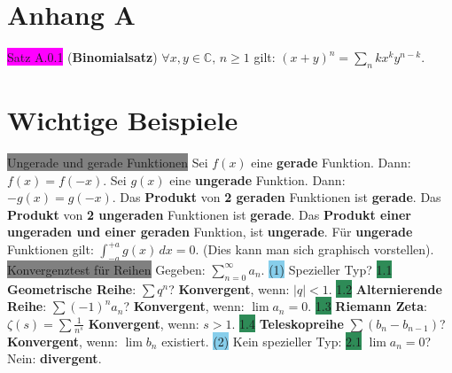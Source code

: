 \documentclass[landscape, 10pt]{article}
\newcommand{\C}{\mathbb{C}}
\begin{document}
\begin{multicols}{3}
\section{Anhang A}
\colorbox{magenta}{Satz A.0.1} (\textbf{Binomialsatz}) 
                \textcolor{NavyBlue}{$\forall x,y\in\C,\,n\geqslant1$} gilt: 
                \textcolor{NavyBlue}{$(x+y)^n=\sum_{n}{k}x^ky^{n-k}$}.


\section{Wichtige Beispiele}
\colorbox{gray}{Ungerade und gerade Funktionen} Sei \textcolor{NavyBlue}{$f(x)$}
                eine \textbf{gerade} Funktion. Dann: \textcolor{NavyBlue}{$f(x)=f(-x)$}.
                Sei \textcolor{NavyBlue}{$g(x)$} eine \textbf{ungerade} 
         Funktion. Dann: \textcolor{NavyBlue}{$-g(x)=g(-x)$}.
                Das \textbf{Produkt} von \textbf{2 geraden} Funktionen 
                ist \textbf{gerade}. Das \textbf{Produkt} von \textbf{2 
         ungeraden}
                Funktionen ist \textbf{gerade}. Das \textbf{Produkt einer 
                ungeraden und einer geraden} Funktion,
                ist \textbf{ungerade}.
         Für \textbf{ungerade} Funktionen gilt:
                \textcolor{NavyBlue}{$\int_{-a}^{+a}g(x)\,dx=0$}. (Dies kann man sich
                graphisch vorstellen).
\colorbox{gray}{Konvergenztest für Reihen}
                Gegeben: \textcolor{NavyBlue}{$\sum_{n=0}^\infty a_n$}.
         \colorbox{SkyBlue}{(1)} Spezieller Typ?
         \colorbox{SeaGreen}{1.1} \textbf{Geometrische Reihe}: 
                \textcolor{NavyBlue}{$\sum q^n$}? 
                \textbf{Konvergent}, 
                wenn: \textcolor{NavyBlue}{$|q|<1$}.
         \colorbox{SeaGreen}{1.2} \textbf{Alternierende Reihe}: 
                \textcolor{NavyBlue}{$\sum(-1)^na_n$}? 
                \textbf{Konvergent}, wenn:
                \textcolor{NavyBlue}{$\lim a_n=0$}.
         \colorbox{SeaGreen}{1.3} \textbf{Riemann Zeta}: 
                \textcolor{NavyBlue}{$\zeta(s)=\sum\frac{1}{n^s}$} 
                \textbf{Konvergent}, wenn: \textcolor{NavyBlue}{$s>1$}.
         \colorbox{SeaGreen}{1.4} \textbf{Teleskopreihe} 
                \textcolor{NavyBlue}{$\sum(b_n-b_{n-1})$}? 
                \textbf{Konvergent}, wenn: 
                \textcolor{NavyBlue}{$\lim b_n$} existiert.
         \colorbox{SkyBlue}{(2)} Kein spezieller Typ:
         \colorbox{SeaGreen}{2.1} \textcolor{NavyBlue}{$\lim a_n=0$}? 
                Nein: \textbf{divergent}.

\end{multicols}
\end{document}
